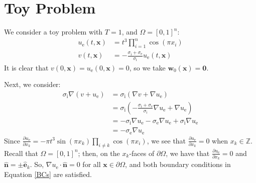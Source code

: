 \documentclass{article}
\newcommand{\bvec}[1]{\boldsymbol{#1}}
\newcommand{\brvec}[1]{\mathbf{#1}}
\begin{document}
\newpage

\section{Toy Problem}

We consider a toy problem with $T = 1$, and $\Omega = [0, 1]^n$:
\begin{align}
    u_\text{e}(t, \bvec{x}) & = t^3 \prod_{i = 1}^n \cos(\pi x_i) \\
    v(t, \bvec{x}) & = -\frac{\sigma_\text{i} + \sigma_\text{e}}{\sigma_\text{i}} u_\text{e}(t, \bvec{x})
\end{align}
\noindent It is clear that $v(0, \bvec{x}) = u_\text{e}(0, \bvec{x}) = 0$, so we take $\bvec{w}_0(\bvec{x}) = \brvec{0}$.

Next, we consider:
\begin{align*}
    \sigma_\text{i} \nabla (v + u_\text{e})
        & = \sigma_\text{i} (\nabla v + \nabla u_\text{e}) \\
        & = \sigma_\text{i} (-\frac{\sigma_\text{i} + \sigma_\text{e}}{\sigma_\text{i}} \nabla u_\text{e} + \nabla u_\text{e}) \\
        & = -\sigma_\text{i} \nabla u_\text{e} - \sigma_\text{e} \nabla u_\text{e} + \sigma_\text{i} \nabla u_\text{e} \\
        & = -\sigma_\text{e} \nabla u_\text{e}
\end{align*}
\noindent Since $\frac{\partial u_\text{e}}{\partial x_k} = -\pi t^3 \sin(\pi x_k) \prod_{i \neq k} \cos(\pi x_i)$, we see that
$\frac{\partial u_\text{e}}{\partial x_k} = 0$ when $x_k \in \mathbb{Z}$.
Recall that $\Omega = [0, 1]^n$; then, on the $x_k$-faces of $\partial \Omega$,
we have that $\frac{\partial u_\text{e}}{\partial x_k} = 0$
and $\hat{\brvec{n}} = \pm \hat{\brvec{e}}_k$.
So, $\nabla u_\text{e} \cdot \hat{\brvec{n}} = 0$ for all $\bvec{x} \in \partial \Omega$,
and both boundary conditions in Equation \ref{BCs} are satisfied.
\end{document}
